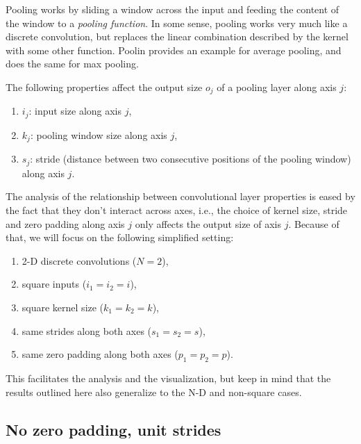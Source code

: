 \documentclass[%
oneside,                 %
final,                   %
10pt]{article}
\begin{document}
Pooling works by sliding a window across the input and feeding the content of
the window to a {\em pooling function}. In some sense, pooling works very much
like a discrete convolution, but replaces the linear combination described by
the kernel with some other function. Poolin
provides an example for average pooling, and 
does the same for max pooling.

The following properties affect the output size $o_j$ of a pooling layer
along axis $j$:

\begin{enumerate}
\item $i_j$: input size along axis $j$,

\item $k_j$: pooling window size along axis $j$,

\item $s_j$: stride (distance between two consecutive positions of the pooling window) along axis $j$.
\end{enumerate}

\noindent
The analysis of the relationship between convolutional layer properties is eased
by the fact that they don't interact across axes, i.e., the choice of kernel
size, stride and zero padding along axis $j$ only affects the output size of
axis $j$. Because of that, we will focus on the following simplified
setting:

\begin{enumerate}
\item 2-D discrete convolutions ($N = 2$),

\item square inputs ($i_1 = i_2 = i$),

\item square kernel size ($k_1 = k_2 = k$),

\item same strides along both axes ($s_1 = s_2 = s$),

\item same zero padding along both axes ($p_1 = p_2 = p$).
\end{enumerate}

\noindent
This facilitates the analysis and the visualization, but keep in mind that the
results outlined here also generalize to the N-D and non-square cases.

\subsection{No zero padding, unit strides}
\end{document}
